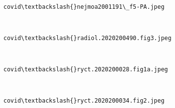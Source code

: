 \documentclass[11pt]{article}
\begin{document}
    \begin{center}
    \end{center}
    { \hspace*{\fill} \\}
    
    \begin{Verbatim}[commandchars=\\\{\}]
covid\textbackslash{}nejmoa2001191\_f5-PA.jpeg
    \end{Verbatim}

    \begin{center}
    \end{center}
    { \hspace*{\fill} \\}
    
    \begin{Verbatim}[commandchars=\\\{\}]
covid\textbackslash{}radiol.2020200490.fig3.jpeg
    \end{Verbatim}

    \begin{center}
    \end{center}
    { \hspace*{\fill} \\}
    
    \begin{Verbatim}[commandchars=\\\{\}]
covid\textbackslash{}ryct.2020200028.fig1a.jpeg
    \end{Verbatim}

    \begin{center}
    \end{center}
    { \hspace*{\fill} \\}
    
    \begin{Verbatim}[commandchars=\\\{\}]
covid\textbackslash{}ryct.2020200034.fig2.jpeg
    \end{Verbatim}

    \begin{center}
    \end{center}
    { \hspace*{\fill} \\}
    
\end{document}
